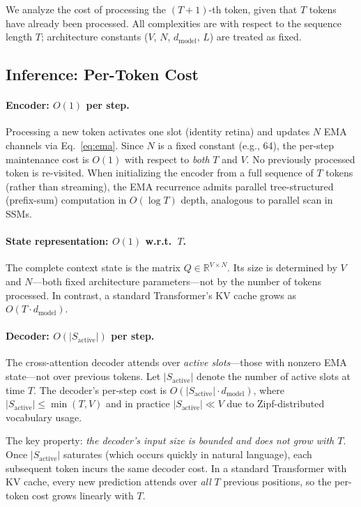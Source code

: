 \documentclass[11pt]{article}
\begin{document}
We analyze the cost of processing the $(T{+}1)$-th token, given that $T$ tokens have already been processed. All complexities are with respect to the sequence length $T$; architecture constants ($V$, $N$, $d_{\text{model}}$, $L$) are treated as fixed.

\subsection{Inference: Per-Token Cost}

\paragraph{Encoder: $O(1)$ per step.}
Processing a new token activates one slot (identity retina) and updates $N$ EMA channels via Eq.~\eqref{eq:ema}. Since $N$ is a fixed constant (e.g., 64), the per-step maintenance cost is $O(1)$ with respect to \emph{both} $T$ and $V$. No previously processed token is re-visited. When initializing the encoder from a full sequence of $T$ tokens (rather than streaming), the EMA recurrence admits parallel tree-structured (prefix-sum) computation in $O(\log T)$ depth, analogous to parallel scan in SSMs.

\paragraph{State representation: $O(1)$ w.r.t.\ $T$.}
The complete context state is the matrix $Q \in \mathbb{R}^{V \times N}$. Its size is determined by $V$ and $N$---both fixed architecture parameters---not by the number of tokens processed. In contrast, a standard Transformer's KV cache grows as $O(T \cdot d_{\text{model}})$.

\paragraph{Decoder: $O(|S_{\text{active}}|)$ per step.}
The cross-attention decoder attends over \emph{active slots}---those with nonzero EMA state---not over previous tokens. Let $|S_{\text{active}}|$ denote the number of active slots at time $T$. The decoder's per-step cost is $O(|S_{\text{active}}| \cdot d_{\text{model}})$, where $|S_{\text{active}}| \le \min(T, V)$ and in practice $|S_{\text{active}}| \ll V$ due to Zipf-distributed vocabulary usage.

The key property: \emph{the decoder's input size is bounded and does not grow with $T$}. Once $|S_{\text{active}}|$ saturates (which occurs quickly in natural language), each subsequent token incurs the same decoder cost. In a standard Transformer with KV cache, every new prediction attends over \emph{all} $T$ previous positions, so the per-token cost grows linearly with $T$.
\end{document}
